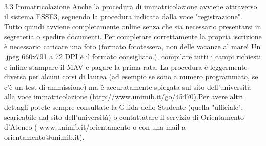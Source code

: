 3.3 Immatricolazione
Anche la procedura di immatricolazione avviene attraverso il sistema ESSE3, seguendo la procedura indicata dalla voce "registrazione". Tutto quindi avviene completamente online senza che sia necessario presentarsi in segreteria o spedire documenti. Per completare correttamente la propria iscrizione è necessario caricare una foto (formato fototessera, non delle vacanze al mare! Un .jpeg 660x791 a 72 DPI è il formato consigliato.), compilare tutti i campi richiesti e infine stampare il MAV e pagare la prima rata.
La procedura è leggermente diversa per alcuni corsi di laurea (ad esempio se sono a numero programmato, se c'è un test di ammissione) ma è accuratamente spiegata sul sito dell'università alla voce immatricolazione (http://www.unimib.it/go/45470).Per avere altri dettagli potete sempre consultate la Guida dello Studente (quella "ufficiale", scaricabile dal sito dell'università) o contattatare il servizio di Orientamento d'Ateneo ( www.unimib.it/orientamento o con una mail a orientamento@unimib.it).
